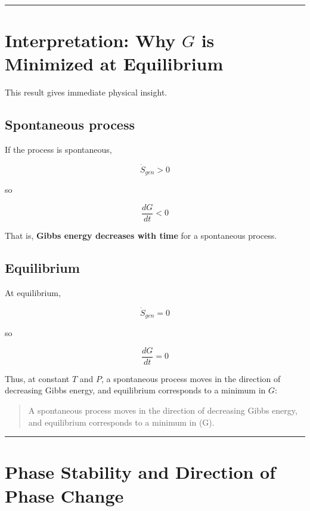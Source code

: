 \documentclass[
  letterpaper,
  DIV=11,
  numbers=noendperiod]{scrartcl}
\begin{document}
\begin{center}\rule{0.5\linewidth}{0.5pt}\end{center}

\section{\texorpdfstring{Interpretation: Why \(G\) is Minimized at
Equilibrium}{Interpretation: Why G is Minimized at Equilibrium}}\label{interpretation-why-g-is-minimized-at-equilibrium}

This result gives immediate physical insight.

\subsection{Spontaneous process}\label{spontaneous-process}

If the process is spontaneous,

\[
\dot{S}_{gen} > 0
\]

so

\[
\frac{dG}{dt} < 0
\]

That is, \textbf{Gibbs energy decreases with time} for a spontaneous
process.

\subsection{Equilibrium}\label{equilibrium}

At equilibrium,

\[
\dot{S}_{gen} = 0
\]

so

\[
\frac{dG}{dt} = 0
\]

Thus, at constant \(T\) and \(P\), a spontaneous process moves in the
direction of decreasing Gibbs energy, and equilibrium corresponds to a
minimum in \(G\):

\begin{quote}
A spontaneous process moves in the direction of decreasing Gibbs energy,
and equilibrium corresponds to a minimum in (G).
\end{quote}

\begin{center}\rule{0.5\linewidth}{0.5pt}\end{center}

\section{Phase Stability and Direction of Phase
Change}\label{phase-stability-and-direction-of-phase-change}
\end{document}
